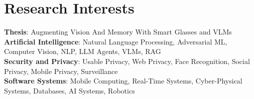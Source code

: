 \section{Research Interests}
 \begin{itemize}[leftmargin=0.5cm, label={}]
    \small{\item{
     \textbf{Thesis}{: Augmenting Vision And Memory With Smart Glasses and VLMs} \\\vspace{1pt}
     \textbf{Artificial Intelligence}{: Natural Language Processing, Adversarial ML, Computer Vision, NLP, LLM Agents, VLMs, RAG} \\\vspace{1pt}
     \textbf{Security and Privacy}{: Usable Privacy, Web Privacy, Face Recognition, Social Privacy, Mobile Privacy, Surveillance} \\\vspace{1pt}
     \textbf{Software Systems}{: Mobile Computing, Real-Time Systems, Cyber-Physical Systems, Databases, AI Systems, Robotics} \\\vspace{1pt}
    }}
 \end{itemize}